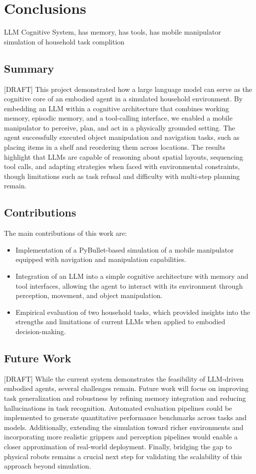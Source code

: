\documentclass[../report.tex]{subfiles}
\begin{document}
\section{Conclusions}
\label{sec:conclusions}
LLM Cognitive System,
has memory,
has tools,
has mobile manipulator
simulation of household
task complition

\subsection{Summary}
\label{sec:conclusions:summary}
[DRAFT]
This project demonstrated how a large language model can serve as the cognitive core of an embodied agent in a simulated household environment. By embedding an LLM within a cognitive architecture that combines working memory, episodic memory, and a tool-calling interface, we enabled a mobile manipulator to perceive, plan, and act in a physically grounded setting. The agent successfully executed object manipulation and navigation tasks, such as placing items in a shelf and reordering them across locations. The results highlight that LLMs are capable of reasoning about spatial layouts, sequencing tool calls, and adapting strategies when faced with environmental constraints, though limitations such as task refusal and difficulty with multi-step planning remain.

\subsection{Contributions}
\label{sec:conclusions:contributions}
The main contributions of this work are:
\begin{itemize}
	\item Implementation of a PyBullet-based simulation of a mobile manipulator equipped with navigation and manipulation capabilities.
	\item Integration of an LLM into a simple cognitive architecture with memory and tool interfaces, allowing the agent to interact with its environment through perception, movement, and object manipulation.
	\item Empirical evaluation of two household tasks, which provided insights into the strengths and limitations of current LLMs when applied to embodied decision-making.
\end{itemize}

\subsection{Future Work}
\label{sec:conclusions:future_work}
[DRAFT]
While the current system demonstrates the feasibility of LLM-driven embodied agents, several challenges remain. Future work will focus on improving task generalization and robustness by refining memory integration and reducing hallucinations in task recognition. Automated evaluation pipelines could be implemented to generate quantitative performance benchmarks across tasks and models. Additionally, extending the simulation toward richer environments and incorporating more realistic grippers and perception pipelines would enable a closer approximation of real-world deployment. Finally, bridging the gap to physical robots remains a crucial next step for validating the scalability of this approach beyond simulation.
\end{document}
